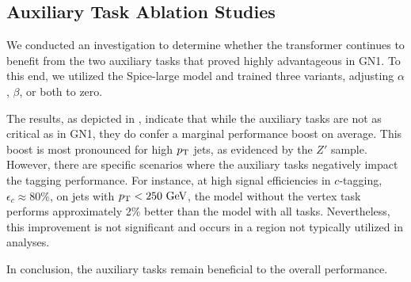 \subsection{Auxiliary Task Ablation Studies}

We conducted an investigation to determine whether the transformer continues to benefit from the two auxiliary tasks that proved highly advantageous in GN1.
To this end, we utilized the Spice-large model and trained three variants, adjusting $\alpha$, $\beta$, or both to zero.

The results, as depicted in , indicate that while the auxiliary tasks are not as critical as in GN1, they do confer a marginal performance boost on average.
This boost is most pronounced for high $p_{\text{T}}$ jets, as evidenced by the $Z'$ sample.
However, there are specific scenarios where the auxiliary tasks negatively impact the tagging performance.
For instance, at high signal efficiencies in $c$-tagging, $\epsilon_c \approx 80\%$, on jets with $\pt < 250~\GeV$, the model without the vertex task performs approximately 2\% better than the model with all tasks.
Nevertheless, this improvement is not significant and occurs in a region not typically utilized in analyses.

In conclusion, the auxiliary tasks remain beneficial to the overall performance.

